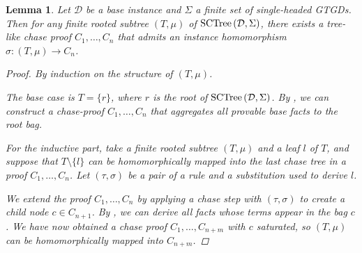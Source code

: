 \documentclass[12pt]{report}
\theoremstyle{plain}
\newtheorem{lemma}[theorem]{Lemma}
\theoremstyle{definition}
\newcommand{\SCTree}[2]{\ensuremath{\normalfont{\textrm{SCTree}} \left( #1, #2 \right)}}
\begin{document}
\begin{lemma}
\label{sctree-subtree-embeds-into-a-chase-proof}
  Let $\mathcal{D}$ be a base instance and $\Sigma$ a finite set of single-headed GTGDs. Then for any finite rooted subtree $(T, \mu)$ of $\SCTree{\mathcal{D}}{\Sigma}$, there exists a tree-like chase proof $C_1, \ldots, C_n$ that admits an instance homomorphism $\sigma: (T, \mu) \rightarrow C_n$.
  \begin{proof}
    By induction on the structure of $(T, \mu)$.

    The base case is $T = \{r\}$, where $r$ is the root of $\SCTree{\mathcal{D}}{\Sigma}$. By , we can construct a chase-proof $C_1, \ldots, C_n$ that aggregates all provable base facts to the root bag.

    For the inductive part, take a finite rooted subtree $(T, \mu)$ and a leaf $l$ of $T$, and suppose that $T \setminus \{l\}$ can be homomorphically mapped into the last chase tree in a proof $C_1, \ldots, C_n$. Let $(\tau, \sigma)$ be a pair of a rule and a substitution used to derive $l$.
    
    We extend the proof $C_1, \ldots, C_n$ by applying a chase step with $(\tau, \sigma)$ to create a child node $c \in C_{n+1}$. By , we can derive all facts whose terms appear in the bag $c$. We have now obtained a chase proof $C_1, \ldots, C_{n+m}$ with $c$ saturated, so $(T, \mu)$ can be homomorphically mapped into $C_{n+m}$.
  \end{proof}
\end{lemma}
\end{document}
